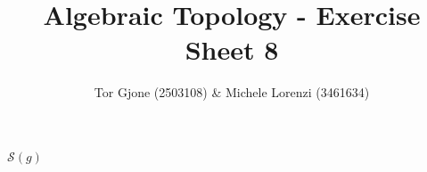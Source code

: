 \documentclass[a4paper,11pt,english]{article}
\title{\textbf{Algebraic Topology} - Exercise Sheet 8}
\author{Tor Gjone (2503108) \& Michele Lorenzi (3461634)}
\renewcommand{\S}[1][g]{\mathcal{S}(#1)}
\begin{document}
\mmaketitle

\begin{exercise}[1]
$\S $

\end{exercise}
\end{document}
